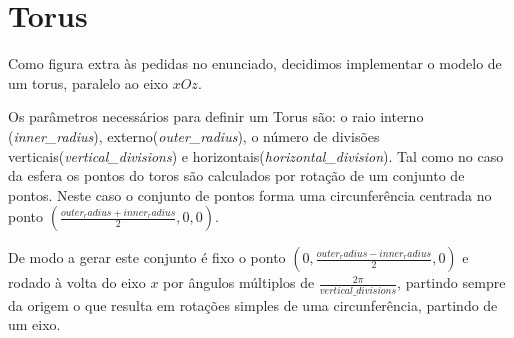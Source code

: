 \documentclass[14pt, a4 paper]{report}
\begin{document}
\section{Torus}

Como figura extra às pedidas no enunciado, decidimos implementar o modelo de um torus, paralelo ao eixo $xOz$.

Os parâmetros necessários para definir um Torus são: 
o raio interno (\textit{inner\_radius}), externo(\textit{outer\_radius}), o número de divisões verticais(\textit{vertical\_divisions}) e horizontais(\textit{horizontal\_division}).
Tal como no caso da esfera os pontos do toros são calculados por rotação de um conjunto de pontos.
Neste caso o conjunto de pontos forma uma circunferência centrada no ponto $(\frac{outer_radius+inner_radius}{2},0,0)$.

De modo a gerar este conjunto é fixo o ponto $(0,\frac{outer_radius-inner_radius}{2},0)$ e rodado à volta do eixo $x$ por ângulos múltiplos de $\frac{2\pi}{vertical\_divisions}$, partindo sempre da origem o que resulta em rotações simples de uma circunferência, partindo de um eixo.
\end{document}
